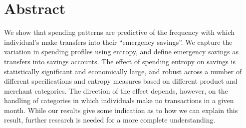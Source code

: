 
\section{Abstract}

We show that spending patterns are predictive of the frequency with which
individual's make transfers into their ``emergency savings''. We capture
the variation in spending profiles using entropy, and define emergency
savings as transfers into savings accounts. The effect of spending entropy
on savings is statistically significant and economically large, and robust
across a number of different specifications and entropy measures based on
different product and merchant categories. The direction of the effect
depends, however, on the handling of categories in which individuals make
no transactions in a given month. While our results give some indication as
to how we can explain this result, further research is needed for a more
complete understanding.
